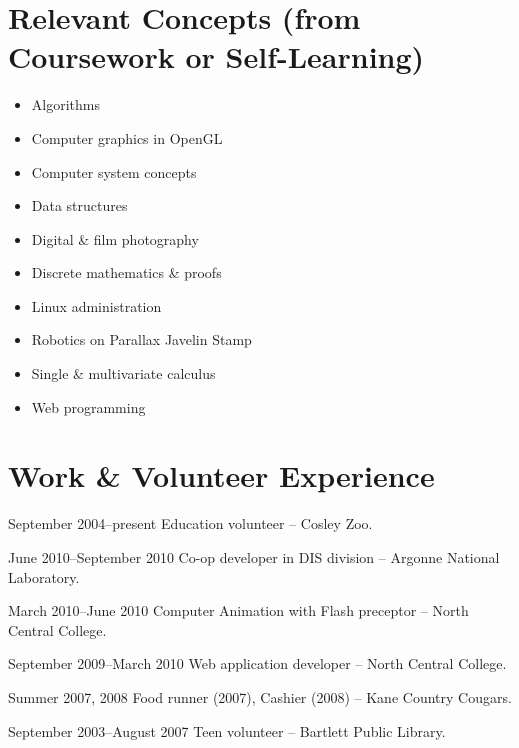 \documentclass[11pt]{simplecv}
\begin{document}
  \section{Relevant Concepts (from Coursework or Self-Learning)}
  \begin{multicols}{2}
    \begin{itemize}
      \item Algorithms
      \item Computer graphics in OpenGL
      \item Computer system concepts
      \item Data structures
      \item Digital \& film photography
      \item Discrete mathematics \& proofs
      \item Linux administration
      \item Robotics on Parallax Javelin Stamp
      \item Single \& multivariate calculus
      \item Web programming
    \end{itemize}
  \end{multicols}

  \section{Work \& Volunteer Experience}
  \begin{topic}
    \item[September 2004--present] Education volunteer -- Cosley Zoo.
    \item[June 2010--September 2010] Co-op developer in DIS division -- Argonne National Laboratory.
    \item[March 2010--June 2010] Computer Animation with Flash preceptor -- North Central College.
    \item[September 2009--March 2010] Web application developer -- North Central College.
    \item[Summer 2007, 2008] Food runner (2007), Cashier (2008) -- Kane Country Cougars.
    \item[September 2003--August 2007] Teen volunteer -- Bartlett Public Library.
  \end{topic}
\end{document}
